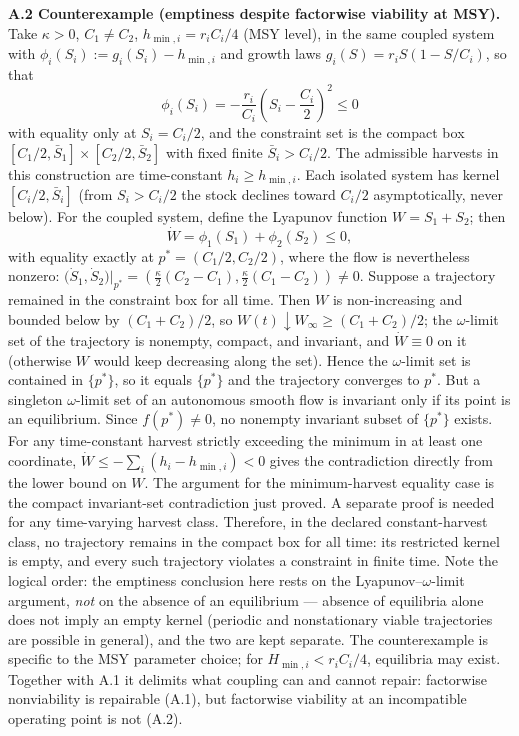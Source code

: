 \documentclass[11pt]{article}
\theoremstyle{definition}
\begin{document}
\textbf{A.2 Counterexample (emptiness despite factorwise viability at
MSY).} Take \(\kappa > 0\), \(C_1 \ne C_2\), \(h_{\min,i} = r_i C_i / 4\) (MSY level), in the same coupled system with \(\phi_i(S_i) := g_i(S_i) - h_{\min,i}\) and growth laws
\(g_i(S) = r_i S (1 - S/C_i)\), so that
\[\phi_i(S_i) = -\frac{r_i}{C_i}\left(S_i - \frac{C_i}{2}\right)^2 \le 0\]
with equality only at \(S_i = C_i/2\), and the constraint set is the compact box \([C_1/2, \bar S_1] \times [C_2/2, \bar S_2]\) with fixed finite \(\bar S_i>C_i/2\). The admissible harvests in this construction are time-constant \(h_i\ge h_{\min,i}\). Each isolated system has kernel \([C_i/2, \bar S_i]\) (from \(S_i > C_i/2\) the stock
declines toward \(C_i/2\) asymptotically, never below). For the coupled
system, define the Lyapunov function \(W = S_1 + S_2\); then
\[\dot W = \phi_1(S_1) + \phi_2(S_2) \le 0,\] with equality exactly at
\(p^* = (C_1/2, C_2/2)\), where the flow is nevertheless nonzero:
\(\big(\dot S_1, \dot S_2\big)\big|_{p^*} = \left(\tfrac{\kappa}{2}(C_2 - C_1), \tfrac{\kappa}{2}(C_1 - C_2)\right) \ne 0.\)
Suppose a trajectory remained in the constraint box for all time. Then
\(W\) is non-increasing and bounded below by \((C_1 + C_2)/2\), so
\(W(t) \downarrow W_\infty \ge (C_1 + C_2)/2\); the \(\omega\)-limit set
of the trajectory is nonempty, compact, and invariant, and
\(\dot W \equiv 0\) on it (otherwise \(W\) would keep decreasing along
the set). Hence the \(\omega\)-limit set is contained in \(\{p^*\}\), so
it equals \(\{p^*\}\) and the trajectory converges to \(p^*\). But a singleton \(\omega\)-limit set of an autonomous smooth flow is invariant only if its point is an equilibrium. Since \(f(p^*)\ne0\), no nonempty invariant subset of \(\{p^*\}\) exists. For any time-constant harvest strictly exceeding the minimum in at least one coordinate, \(\dot W\le-\sum_i(h_i-h_{\min,i})<0\) gives the contradiction directly from the lower bound on \(W\). The argument for the minimum-harvest equality case is the compact invariant-set contradiction just proved. A separate proof is needed for any time-varying harvest class.
Therefore, in the declared constant-harvest class, no trajectory remains in the compact box for all time: its restricted kernel is empty, and every such trajectory violates a constraint in finite time. Note the logical
order: the emptiness conclusion here rests on the
Lyapunov--\(\omega\)-limit argument, \emph{not} on the absence of an
equilibrium --- absence of equilibria alone does not imply an empty
kernel (periodic and nonstationary viable trajectories are possible in
general), and the two are kept separate. The counterexample is
specific to the MSY parameter choice; for \(H_{\min,i} < r_i C_i / 4\),
equilibria may exist. Together with A.1 it delimits what coupling can
and cannot repair: factorwise nonviability is repairable (A.1), but
factorwise viability at an incompatible operating point is not (A.2).
\end{document}
